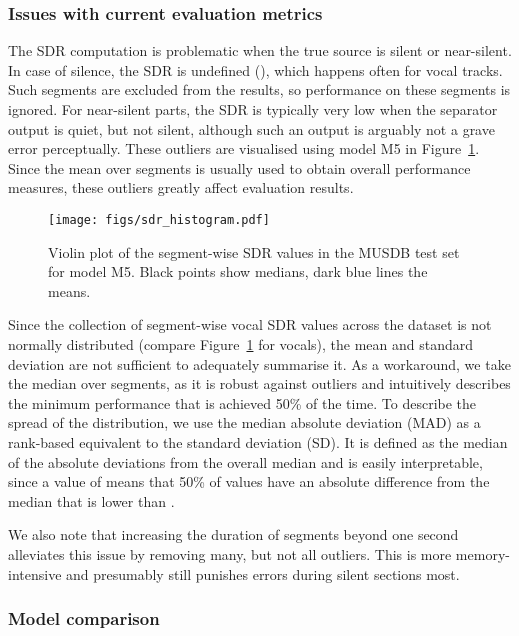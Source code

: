 \documentclass{article}
\begin{document}
\subsubsection{Issues with current evaluation metrics}
\label{sec:results_quantitative_issues}

The SDR computation is problematic when the true source is silent or near-silent.
In case of silence, the SDR is undefined (), which happens often for vocal tracks. Such segments are excluded from the results, so performance on these segments is ignored.
For near-silent parts, the SDR is typically very low when the separator output is quiet, but not silent, although such an output is arguably not a grave error perceptually.
These outliers are visualised using model M5 in Figure~\ref{fig:sdr}.
Since the mean over segments is usually used to obtain overall performance measures, these outliers greatly affect evaluation results.

\begin{figure}[t]
\centering
\centerline{\texttt{[image: figs/sdr\_histogram.pdf]}}
\caption{Violin plot of the segment-wise SDR values in the MUSDB test set for model M5. Black points show medians, dark blue lines the means.}
\label{fig:sdr}
\end{figure}

Since the collection of segment-wise vocal SDR values across the dataset is not normally distributed (compare Figure~\ref{fig:sdr} for vocals), the mean and standard deviation are not sufficient to adequately summarise it.
As a workaround, we take the median over segments, as it is robust against outliers and intuitively describes the minimum performance that is achieved 50\% of the time.
To describe the spread of the distribution, we use the median absolute deviation (MAD) as a rank-based equivalent to the standard deviation (SD).
It is defined as the median of the absolute deviations from the overall median and is easily interpretable, since a value of  means that 50\% of values have an absolute difference from the median that is lower than .

We also note that increasing the duration of segments beyond one second alleviates this issue by removing many, but not all outliers. This is more memory-intensive and presumably still punishes errors during silent sections most.

\subsubsection{Model comparison}
\label{sec:results_comparison}
\end{document}
